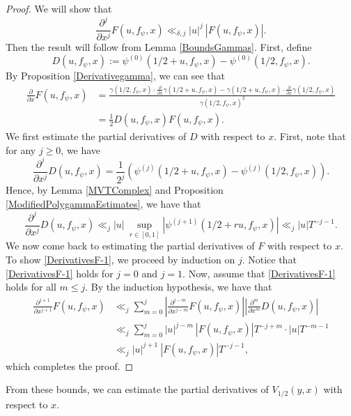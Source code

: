\documentclass[11pt]{amsart}
\theoremstyle{definition}
\theoremstyle{remark}
\begin{document}
\begin{proof}
We will show that
\begin{equation}
    \frac{\partial^j}{\partial x^j} F(u,f_{\psi},x) \ll_{\delta, j} |u|^{j} \: |F(u,f_{\psi},x)|. \label{DerivativesF-1}
\end{equation}
Then the result will follow from Lemma \ref{BoundsGammas}. First, define $$ D(u,f_{\psi},x) := \psi^{(0)}(1/2 + u,f_{\psi},x) - \psi^{(0)}(1/2,f_{\psi},x).$$ By Proposition \ref{Derivativegamma}, we can see that 
\begin{align*}
    \frac{\partial}{\partial x} F(u,f_{\psi},x) &= \frac{\gamma(1/2,f_{\psi},x) \cdot \frac{\partial}{\partial x} \gamma(1/2+u,f_{\psi},x) - \gamma(1/2+u,f_{\psi},x) \cdot \frac{\partial}{\partial x} \gamma(1/2,f_{\psi},x)}{\gamma(1/2, f_{\psi},x)^2} \\
    &= \frac{1}{2} D(u,f_{\psi},x) F(u,f_{\psi},x).
\end{align*}
We first estimate the partial derivatives of $D$ with respect to $x$. First, note that for any $j\geq 0$, we have $$ \frac{\partial^{j}}{\partial x^{j}} D(u,f_{\psi},x) = \frac{1}{2^j}\left( \psi^{(j)}(1/2+u,f_{\psi},x) - \psi^{(j)}(1/2,f_{\psi},x) \right).$$ Hence, by Lemma \ref{MVTComplex} and Proposition \ref{ModifiedPolygammaEstimates}, we have that
\begin{equation*}
    \frac{\partial^{j}}{\partial x^{j}} D(u,f_{\psi},x) \ll_{j} |u| \: \sup_{r\in [0,1]} \left|\psi^{(j+1)}(1/2 + ru, f_{\psi},x)\right| \ll_{j} |u| T^{-j-1}. 
\end{equation*}
We now come back to estimating the partial derivatives of $F$ with respect to $x$. To show \eqref{DerivativesF-1}, we proceed by induction on $j$. Notice that \eqref{DerivativesF-1} holds for $j=0$ and $j=1$. Now, assume that \eqref{DerivativesF-1} holds for all $m\leq j$. By the induction hypothesis, we have that 
\begin{align*}
    \frac{\partial^{j+1}}{\partial x^{j+1}} F(u,f_{\psi},x) &\ll_{j} \sum_{m=0}^{j} \left| \frac{\partial^{j-m}}{\partial x^{j-m}} F(u,f_{\psi},x) \right| \left| \frac{\partial^{m}}{\partial x^{m}} D(u,f_{\psi},x) \right| \\
    &\ll_{j} \sum_{m=0}^{j} |u|^{j-m} \: |F(u,f_{\psi},x)| T^{-j+m} \cdot |u|T^{-m-1} \\
    &\ll_{j} |u|^{j+1} \: |F(u,f_{\psi},x)| T^{-j-1},
\end{align*}
which completes the proof.
\end{proof}

From these bounds, we can estimate the partial derivatives of $V_{1/2}(y,x)$ with respect to $x$.
\end{document}
